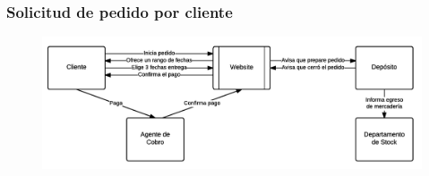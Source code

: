 \clearpage
\subsubsection{Solicitud de pedido por cliente}
\begin{figure}[H]
  \includegraphics[width=\linewidth]{images/solicitud-de-pedido-por-cliente.png}
\end{figure}
